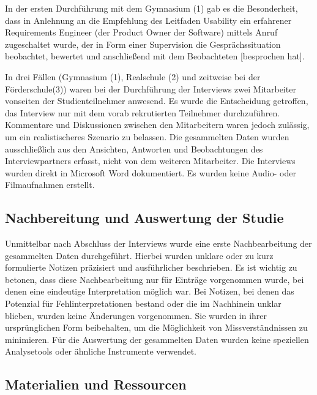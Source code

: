 In der ersten Durchführung mit dem Gymnasium (1) gab es die Besonderheit, dass  in Anlehnung an die Empfehlung des Leitfaden Usability ein erfahrener Requirements Engineer (der Product Owner der Software) mittels Anruf zugeschaltet wurde, der \glqq in Form einer Supervision die Gesprächssituation beobachtet, bewertet und anschließend mit dem Beobachteten [besprochen hat]\grqq{}\cite{dakks}.

In drei Fällen (Gymnasium (1), Realschule (2) und zeitweise bei der Förderschule(3)) waren bei der Durchführung der Interviews zwei Mitarbeiter vonseiten der Studienteilnehmer anwesend. Es wurde die Entscheidung getroffen, das Interview nur mit dem vorab rekrutierten Teilnehmer durchzuführen. Kommentare und Diskussionen zwischen den Mitarbeitern waren jedoch zulässig, um ein realistischeres Szenario zu belassen. Die gesammelten Daten wurden ausschließlich aus den Ansichten, Antworten und Beobachtungen des Interviewpartners erfasst, nicht von dem weiteren Mitarbeiter. Die Interviews wurden direkt in Microsoft Word dokumentiert. Es wurden keine Audio- oder Filmaufnahmen erstellt.

\subsection{Nachbereitung und Auswertung der Studie}

Unmittelbar nach Abschluss der Interviews wurde eine erste Nachbearbeitung der gesammelten Daten durchgeführt. Hierbei wurden unklare oder zu kurz formulierte Notizen präzisiert und ausführlicher beschrieben. Es ist wichtig zu betonen, dass diese Nachbearbeitung nur für Einträge vorgenommen wurde, bei denen eine eindeutige Interpretation möglich war. Bei Notizen, bei denen das Potenzial für Fehlinterpretationen bestand oder die im Nachhinein unklar blieben, wurden keine Änderungen vorgenommen. Sie wurden in ihrer ursprünglichen Form beibehalten, um die Möglichkeit von Missverständnissen zu minimieren. Für die Auswertung der gesammelten Daten wurden keine speziellen Analysetools oder ähnliche Instrumente verwendet.



\subsection{Materialien und Ressourcen}

